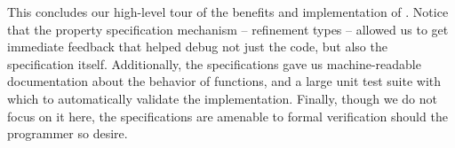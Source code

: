 This concludes our high-level tour of the benefits and 
implementation of \toolname. 
%
Notice that the property specification mechanism -- 
refinement types -- allowed us to get immediate feedback
that helped debug not just the code, but also the specification 
itself. 
%
Additionally, the specifications gave us machine-readable 
documentation about the behavior of functions, and a large 
unit test suite with which to automatically validate the 
implementation.
%
Finally, though we do not focus on it here, the specifications 
are amenable to formal verification should the programmer 
so desire.



